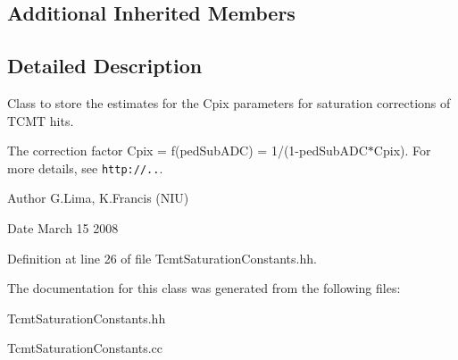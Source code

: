 \subsection*{Additional Inherited Members}


\subsection{Detailed Description}
Class to store the estimates for the Cpix parameters for saturation corrections of T\-C\-M\-T hits. 

The correction factor Cpix = f(ped\-Sub\-A\-D\-C) = 1/(1-\/ped\-Sub\-A\-D\-C$\ast$\-Cpix). For more details, see {\tt http\-://..}. \begin{DoxyAuthor}{Author}
G.\-Lima, K.\-Francis (N\-I\-U) 
\end{DoxyAuthor}
\begin{DoxyDate}{Date}
March 15 2008 
\end{DoxyDate}


Definition at line 26 of file Tcmt\-Saturation\-Constants.\-hh.



The documentation for this class was generated from the following files\-:\begin{DoxyCompactItemize}
\item 
Tcmt\-Saturation\-Constants.\-hh\item 
Tcmt\-Saturation\-Constants.\-cc\end{DoxyCompactItemize}
